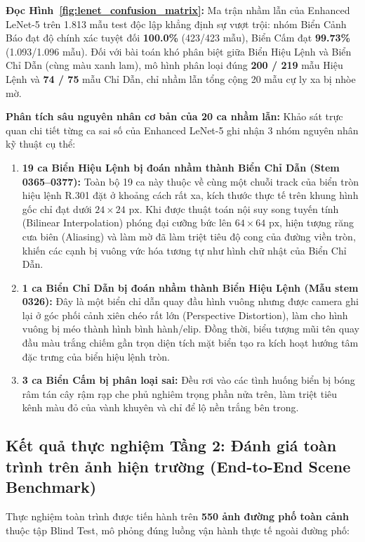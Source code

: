 \documentclass[a4paper, 11pt]{article}
\begin{document}
\textbf{Đọc Hình~\ref{fig:lenet_confusion_matrix}:}
Ma trận nhầm lẫn của Enhanced LeNet-5 trên 1.813 mẫu test độc lập khẳng định sự vượt trội: nhóm Biển Cảnh Báo đạt độ chính xác tuyệt đối \textbf{100.0\%} (423/423 mẫu), Biển Cấm đạt \textbf{99.73\%} (1.093/1.096 mẫu). Đối với bài toán khó phân biệt giữa Biển Hiệu Lệnh và Biển Chỉ Dẫn (cùng màu xanh lam), mô hình phân loại đúng \textbf{200 / 219} mẫu Hiệu Lệnh và \textbf{74 / 75} mẫu Chỉ Dẫn, chỉ nhầm lẫn tổng cộng 20 mẫu cự ly xa bị nhòe mờ.

\textbf{Phân tích sâu nguyên nhân cơ bản của 20 ca nhầm lẫn:}
Khảo sát trực quan chi tiết từng ca sai số của Enhanced LeNet-5 ghi nhận 3 nhóm nguyên nhân kỹ thuật cụ thể:
\begin{enumerate}
    \item \textbf{19 ca Biển Hiệu Lệnh bị đoán nhầm thành Biển Chỉ Dẫn (Stem 0365--0377):} Toàn bộ 19 ca này thuộc về cùng một chuỗi track của biển tròn hiệu lệnh R.301 đặt ở khoảng cách rất xa, kích thước thực tế trên khung hình gốc chỉ đạt dưới $24 \times 24\text{ px}$. Khi được thuật toán nội suy song tuyến tính (Bilinear Interpolation) phóng đại cưỡng bức lên $64 \times 64\text{ px}$, hiện tượng răng cưa biên (Aliasing) và làm mờ đã làm triệt tiêu độ cong của đường viền tròn, khiến các cạnh bị vuông vức hóa tương tự như hình chữ nhật của Biển Chỉ Dẫn.
    \item \textbf{1 ca Biển Chỉ Dẫn bị đoán nhầm thành Biển Hiệu Lệnh (Mẫu stem 0326):} Đây là một biển chỉ dẫn quay đầu hình vuông nhưng được camera ghi lại ở góc phối cảnh xiên chéo rất lớn (Perspective Distortion), làm cho hình vuông bị méo thành hình bình hành/elip. Đồng thời, biểu tượng mũi tên quay đầu màu trắng chiếm gần trọn diện tích mặt biển tạo ra kích hoạt hướng tâm đặc trưng của biển hiệu lệnh tròn.
    \item \textbf{3 ca Biển Cấm bị phân loại sai:} Đều rơi vào các tình huống biển bị bóng râm tán cây rậm rạp che phủ nghiêm trọng phần nửa trên, làm triệt tiêu kênh màu đỏ của vành khuyên và chỉ để lộ nền trắng bên trong.
\end{enumerate}

\subsection{Kết quả thực nghiệm Tầng 2: Đánh giá toàn trình trên ảnh hiện trường (End-to-End Scene Benchmark)}
\label{subsec:benchmark_scene}

Thực nghiệm toàn trình được tiến hành trên \textbf{550 ảnh đường phố toàn cảnh} thuộc tập Blind Test, mô phỏng đúng luồng vận hành thực tế ngoài đường phố:
\end{document}
